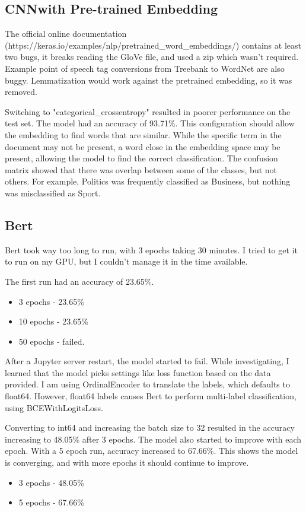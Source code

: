 \documentclass[11pt]{article}
\begin{document}
\subsection{CNNwith Pre-trained Embedding}

The official online documentation (https://keras.io/examples/nlp/pretrained\_word\_embeddings/) contains at least two bugs, it breaks reading the GloVe file, and used a zip which wasn't required. Example point of speech tag conversions from Treebank to WordNet are also buggy. Lemmatization would work against the pretrained embedding, so it was removed.

Switching to "categorical\_crossentropy" resulted in poorer performance on the test set. The model had an accuracy of 93.71\%. This configuration should allow the embedding to find words that are similar. While the specific term in the document may not be present, a word close in the embedding space may be present, allowing the model to find the correct classification. The confusion matrix showed that there was overlap between some of the classes, but not others. For example, Politics was frequently classified as Business, but nothing was misclassified as Sport.

\subsection{Bert}

Bert took way too long to run, with 3 epochs taking 30 minutes. I tried to get it to run on my GPU, but I couldn't manage it in the time available.

The first run had an accuracy of 23.65\%.

\begin{itemize}
\item 3 epochs - 23.65\%
\item 10 epochs - 23.65\%
\item 50 epochs - failed.
\end{itemize}

After a Jupyter server restart, the model started to fail. While investigating, I learned that the model picks settings like loss function based on the data provided. I am using OrdinalEncoder to translate the labels, which defaults to float64. However, float64 labels causes Bert to perform multi-label classification, using BCEWithLogitsLoss.

Converting to int64 and increasing the batch size to 32 resulted in the accuracy increasing to 48.05\% after 3 epochs. The model also started to improve with each epoch. With a 5 epoch run, accuracy increased to 67.66\%. This shows the model is converging, and with more epochs it should continue to improve.

\begin{itemize}
\item 3 epochs - 48.05\%
\item 5 epochs - 67.66\%
\end{itemize}
\end{document}
